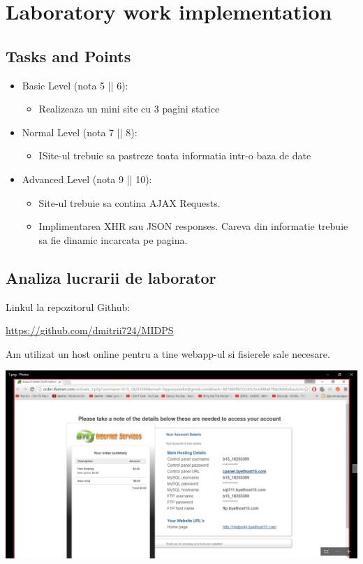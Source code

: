 \section{Laboratory work implementation}

\subsection{Tasks and Points}
\begin{itemize}
	\item Basic Level (nota 5 || 6):
	
	\begin{itemize}
		\item Realizeaza un mini site cu 3 pagini statice
	\end{itemize}
	
	\item Normal Level (nota 7 || 8):
	
	\begin{itemize}
		\item ISite-ul trebuie sa pastreze toata informatia intr-o baza de date
	\end{itemize}
	\item Advanced Level (nota 9 || 10):
	
	\begin{itemize}
		\item Site-ul trebuie sa contina AJAX Requests.
    	\item Implimentarea XHR sau JSON responses. Careva din informatie trebuie sa fie dinamic incarcata pe pagina.
	\end{itemize}
\end{itemize}

\subsection{Analiza lucrarii de laborator}

Linkul la repozitorul Github:\\
\begin{center}
\url{https://github.com/dmitrii724/MIDPS}
\end{center}

Am utilizat un host online pentru a tine webapp-ul si fisierele sale necesare.
\begin{center}
\includegraphics[scale=0.5]{images/1}
\end{center}

